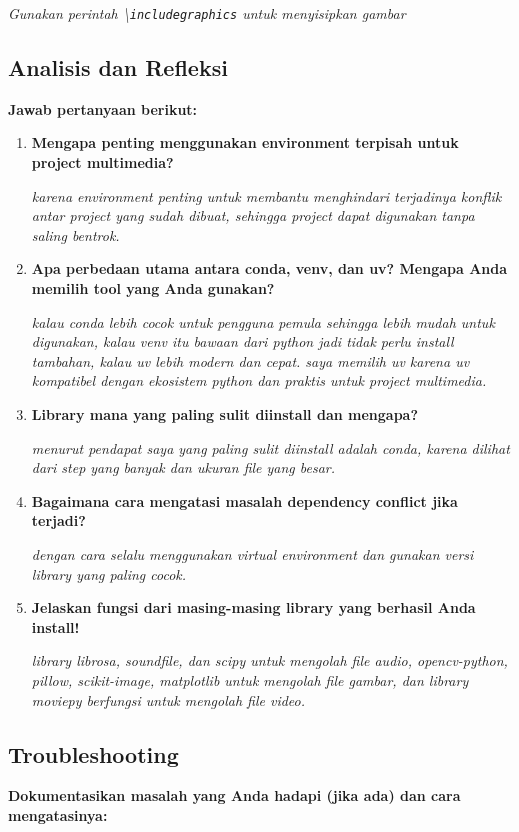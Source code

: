\documentclass[11pt,a4paper]{article}
\begin{document}
\textit{Gunakan perintah \textbackslash\texttt{includegraphics} untuk menyisipkan gambar}

\subsection{Analisis dan Refleksi}
\textbf{Jawab pertanyaan berikut:}

\begin{enumerate}
    \item \textbf{Mengapa penting menggunakan environment terpisah untuk project multimedia?}
    
    \textit{karena environment penting untuk membantu menghindari terjadinya konflik antar project yang sudah dibuat, sehingga project dapat digunakan tanpa saling bentrok. }
    
    \item \textbf{Apa perbedaan utama antara conda, venv, dan uv? Mengapa Anda memilih tool yang Anda gunakan?}
    
    \textit{kalau conda lebih cocok untuk pengguna pemula sehingga lebih mudah untuk digunakan, kalau venv itu bawaan dari python jadi tidak perlu install tambahan, kalau uv lebih modern dan cepat. saya memilih uv karena uv kompatibel dengan ekosistem python dan praktis untuk project multimedia.}
    
    \item \textbf{Library mana yang paling sulit diinstall dan mengapa?}
    
    \textit{menurut pendapat saya yang paling sulit diinstall adalah conda, karena dilihat dari step yang banyak dan ukuran file yang besar.}
    
    \item \textbf{Bagaimana cara mengatasi masalah dependency conflict jika terjadi?}
    
    \textit{dengan cara selalu menggunakan virtual environment dan gunakan versi library yang paling cocok.}
    
    \item \textbf{Jelaskan fungsi dari masing-masing library yang berhasil Anda install!}
    
    \textit{library librosa, soundfile, dan scipy untuk mengolah file audio, opencv-python, pillow, scikit-image, matplotlib untuk mengolah file gambar, dan library moviepy berfungsi untuk mengolah file video. }
\end{enumerate}

\subsection{Troubleshooting}
\textbf{Dokumentasikan masalah yang Anda hadapi (jika ada) dan cara mengatasinya:}
\end{document}
